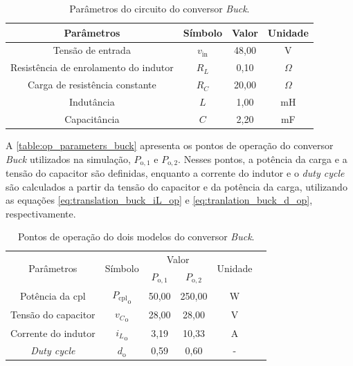\vspace{8pt}
\begin{table}[H]
  \centering
  \begin{tabular}{cccc}
    \toprule
    Parâmetros & Símbolo  & Valor & Unidade \\
    \midrule
    Tensão de entrada & $v_{\mathrm{in}}$ & 48,00 & V \\
    Resistência de enrolamento do indutor & $R_L$ & 0,10 & $\Omega$ \\
    Carga de resistência constante & $R_{C}$ & 20,00 & $\Omega$ \\
    Indutância & $L$ & 1,00 & mH \\
    Capacitância  & $C$ & 2,20 & mF \\
    \bottomrule
  \end{tabular}
  \caption{Parâmetros do circuito do conversor \textit{Buck}.}
  \label{table:circuit_parameter_buck}
\end{table}

A \autoref{table:op_parameters_buck} apresenta os pontos de operação do conversor \textit{Buck} utilizados na simulação, $P_{\mathrm{o}, 1}$ e $P_{\mathrm{o}, 2}$. Nesses pontos, a potência da carga e a tensão do capacitor são definidas, enquanto a corrente do indutor e o \textit{\textit{duty cycle}} são calculados a partir da tensão do capacitor e da potência da carga, utilizando as equações \eqref{eq:translation_buck_iL_op} e \eqref{eq:tranlation_buck_d_op}, respectivamente.

\vspace{8pt}
\begin{table}[H]
  \centering
  \setlength{\tabcolsep}{10pt}
  \begin{tabular}{cccccc}
    \toprule
    \multirow{2}{*}{\centering Parâmetros} & \multirow{2}{*}{\centering Símbolo} & \multicolumn{2}{c}{\centering Valor} & \multirow{2}{*}{\centering Unidade} \\
    \cmidrule{3-4}
     &  & $P_{\mathrm{o}, 1}$ & $P_{\mathrm{o}, 2}$ &  \\
    \midrule
    Potência da \acrshort{cpl} & ${P_{\mathrm{cpl}}}_{\mathrm{o}}$ & 50,00  & 250,00 & W \\
    Tensão do capacitor & ${v_C}_{\mathrm{o}}$ & 28,00 & 28,00  & V \\
    Corrente do indutor & ${i_L}_{\mathrm{o}}$ & 3,19 & 10,33 & A \\
    \textit{\textit{Duty cycle}} & $d_{\mathrm{o}}$ & 0,59 & 0,60 & - \\  
    \bottomrule
  \end{tabular}
  \caption{Pontos de operação do dois modelos do conversor \textit{Buck}.}
  \label{table:op_parameters_buck}
\end{table}

